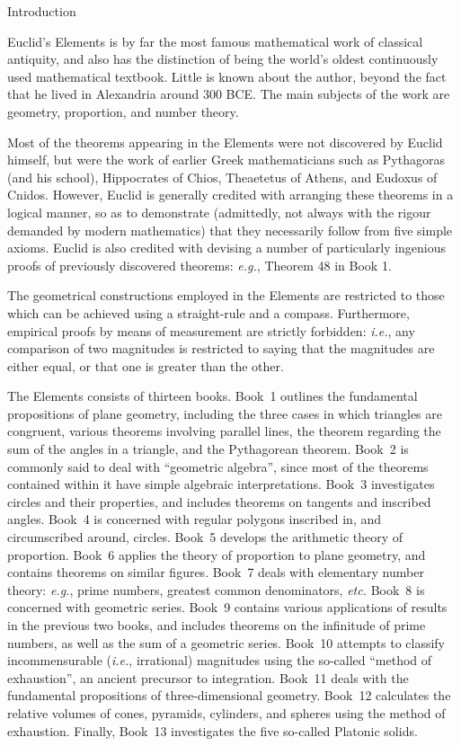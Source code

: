 \begin{center}
{\Large Introduction}
\end{center}

Euclid's Elements is by far the most famous mathematical work of classical antiquity, and also has the distinction of being the world's oldest continuously used mathematical textbook. Little is known about the author, beyond the fact that he lived in Alexandria around 300 BCE. The main subjects  of the work 
are geometry, proportion, and number theory. 

Most of the theorems appearing in the Elements were not discovered by Euclid himself, but were the work of earlier Greek mathematicians such as Pythagoras (and his school), Hippocrates of Chios, Theaetetus of Athens, and Eudoxus of Cnidos. However, Euclid is generally credited with arranging these theorems in a logical manner, so as to demonstrate (admittedly, not always with the rigour demanded by modern mathematics) that they necessarily follow from five simple axioms. Euclid is also credited with devising a number of particularly ingenious proofs of previously discovered theorems: {\em e.g.}, Theorem 48 in Book 1.

The geometrical constructions employed in the Elements are restricted to
those which can be achieved using a straight-rule and a compass.
Furthermore, empirical proofs by means of measurement are strictly forbidden:
{\em i.e.}, 
any comparison of two magnitudes is restricted to saying that the magnitudes
are either equal, or that one is greater than the other.

The Elements consists of thirteen books. Book~1 outlines the fundamental
propositions of plane geometry, including the three cases in which
triangles are congruent, various theorems involving parallel lines, the theorem regarding the sum of the angles in a triangle, and the
Pythagorean theorem. Book~2 is commonly said to deal with ``geometric algebra'', since most of the theorems contained within it have simple algebraic
interpretations.
Book~3 investigates circles and their properties, and includes
theorems on tangents and inscribed angles. Book~4
is concerned with regular polygons inscribed in, and circumscribed around, circles.
Book~5 develops the arithmetic theory of proportion.
Book~6 applies the theory of proportion to plane geometry, and
contains theorems on similar figures. Book~7 deals
with elementary number theory: {\em e.g.}, prime numbers,
greatest common denominators, {\em etc.} Book~8 is concerned with geometric
series. Book~9 contains various applications of  results in the
previous two books, and includes theorems on the
infinitude of prime numbers, as well as the sum of a geometric series.
Book~10 attempts to classify incommensurable ({\em i.e.}, irrational)
magnitudes using the so-called ``method of exhaustion'', an ancient precursor to integration. Book~11 deals with the fundamental propositions of
three-dimensional geometry. Book~12 calculates the relative volumes of
cones, pyramids, cylinders, and spheres using the method of exhaustion.
Finally, Book~13 investigates the five so-called Platonic solids.


